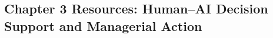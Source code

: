 \begin{refsection}
\chapter{Chapter 3 Resources: Human–AI Decision Support and Managerial Action}
\label{chap:comp-ch03}



\printbibliography[heading=subbibliography,title={Chapter 3 References}]
\end{refsection}
